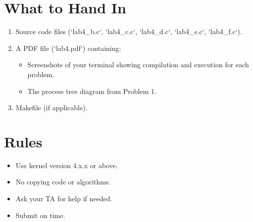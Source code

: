 \documentclass{article}
\begin{document}
\section{What to Hand In}

\begin{enumerate}
    \item Source code files (`lab4_b.c`, `lab4_c.c`, `lab4_d.c`, `lab4_e.c`, `lab4_f.c`).
    \item A PDF file (`lab4.pdf`) containing:
    \begin{itemize}
        \item Screenshots of your terminal showing compilation and execution for each problem.
        \item The process tree diagram from Problem 1.
    \end{itemize}
    \item Makefile (if applicable).
\end{enumerate}


\section{Rules}

\begin{itemize}
    \item Use kernel version 4.x.x or above.
    \item No copying code or algorithms.
    \item Ask your TA for help if needed.
    \item Submit on time.
\end{itemize}
\end{document}
